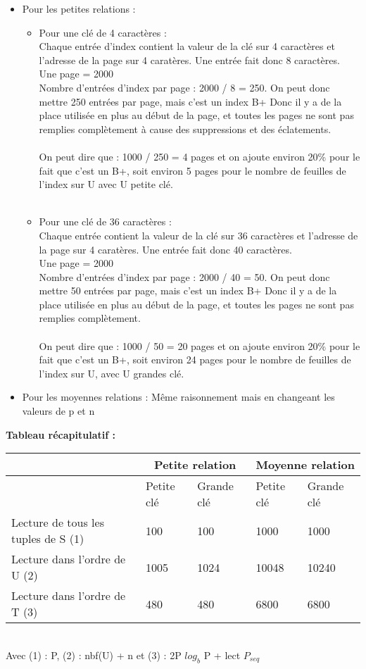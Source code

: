 \documentclass[11pt]{article}
\begin{document}
\begin{itemize}
\item Pour les petites relations :
\begin{itemize}
\item Pour une clé de 4 caractères :\\
Chaque entrée d'index contient la valeur de la clé sur 4 caractères et l'adresse de la page sur 4 caratères. Une entrée fait donc 8 caractères.\\
Une page = 2000\\
Nombre d'entrées d'index par page : 2000 / 8 = 250. On peut donc mettre 250 entrées par page, mais c'est un index B+ Donc il y a de la place utilisée en plus au début de la page, et toutes les pages ne sont pas remplies complètement à cause des suppressions et des éclatements.\\\\
On peut dire que : 1000 / 250 = 4 pages et on ajoute environ 20\% pour le fait que c'est un B+, soit environ 5 pages pour le nombre de feuilles de l'index sur U avec U petite clé.\\\\
\item Pour une  clé de 36 caractères : \\
Chaque entrée contient la valeur de la clé sur 36 caractères et l'adresse de la page sur 4 caratères. Une entrée fait donc 40 caractères.\\
Une page = 2000\\
Nombre d'entrées d'index par page : 2000 / 40 = 50. On peut donc mettre 50 entrées par page, mais c'est un index B+ Donc il y a de la place utilisée en plus au début de la page, et toutes les pages ne sont pas remplies complètement.\\\\
On peut dire que : 1000 / 50 = 20 pages et on ajoute environ 20\% pour le fait que c'est un B+, soit environ 24 pages pour le nombre de feuilles de l'index sur U, avec U grandes clé.\\
\end{itemize}
\item Pour les moyennes relations :
Même raisonnement mais en changeant les valeurs de p et n
\end{itemize}
\textbf{Tableau récapitulatif :}\\
\begin{tabular}{|l|l|l|l|l|}
\hline
& \multicolumn{2}{c|}{Petite relation} & \multicolumn{2}{c|}{Moyenne relation}\\\hline
&Petite clé & Grande clé & Petite clé & Grande clé\\\hline
Lecture de tous les tuples de S (1)& 100 & 100 & 1000 &1000\\\hline
Lecture dans l'ordre de U (2)& 1005& 1024& 10048 & 10240\\\hline
Lecture dans l'ordre de T (3)& 480 & 480 & 6800 & 6800\\\hline
\end{tabular}
\\Avec (1) : P, (2) : nbf(U) + n et (3) : 2P $log_b$ P + lect $P_{seq}$
\end{document}
